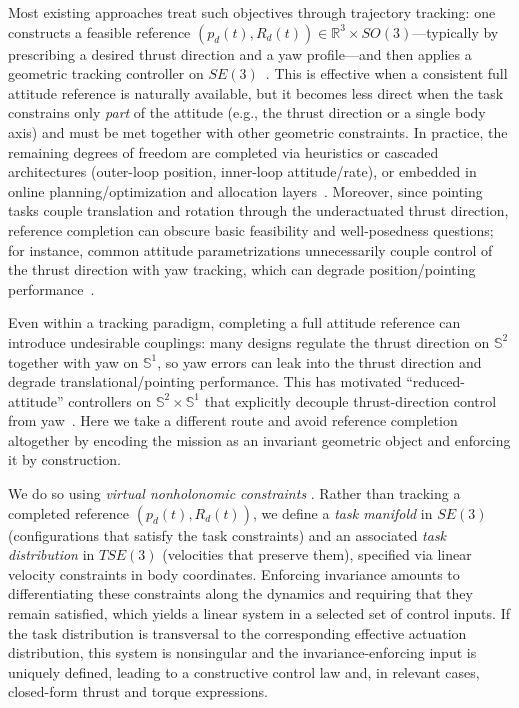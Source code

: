 \documentclass[letterpaper, 10 pt, conference]{ieeeconf}
\begin{document}
Most existing approaches treat such objectives through trajectory tracking: one constructs a feasible reference $(p_d(t),R_d(t))\in\mathbb{R}^{3}\times SO(3)$---typically by prescribing a desired thrust direction and a yaw profile---and then applies a geometric tracking controller on $SE(3)$~\cite{Lee2010CDC,MellingerKumar2011ICRA}. 
This is effective when a consistent full attitude reference is naturally available, but it becomes less direct when the task constrains only \emph{part} of the attitude (e.g., the thrust direction or a single body axis) and must be met together with other geometric constraints. 
In practice, the remaining degrees of freedom are completed via heuristics or cascaded architectures (outer-loop position, inner-loop attitude/rate), or embedded in online planning/optimization and allocation layers~\cite{Bangura2017Thesis,RichterBryRoy2013ISRR,BryRichterBachrachRoy2015IJRR}. 
Moreover, since pointing tasks couple translation and rotation through the underactuated thrust direction, reference completion can obscure basic feasibility and well-posedness questions; for instance, common attitude parametrizations unnecessarily couple control of the thrust direction with yaw tracking, which can degrade position/pointing performance~\cite{kooijman2019trajectory}.



Even within a tracking paradigm, completing a full attitude reference can introduce undesirable couplings: many designs regulate the thrust direction on $\mathbb{S}^2$ together with yaw on $\mathbb{S}^1$, so yaw errors can leak into the thrust direction and degrade translational/pointing performance. This has motivated ``reduced-attitude'' controllers on $\mathbb{S}^2\times \mathbb{S}^1$ that explicitly decouple thrust-direction control from yaw~\cite{kooijman2019trajectory}. Here we take a different route and avoid reference completion altogether by encoding the mission as an invariant geometric object and enforcing it by construction.

We do so using \emph{virtual nonholonomic constraints} \cite{Simoes:linear:nonholonomic, stratoglou2024geometry, stratoglou2024virtualc, simoes2025geometric}. Rather than tracking a completed reference $(p_d(t),R_d(t))$, we define a \emph{task manifold} in $SE(3)$ (configurations that satisfy the task constraints) and an associated \emph{task distribution} in $TSE(3)$ (velocities that preserve them), specified via linear velocity constraints in body coordinates. Enforcing invariance amounts to differentiating these constraints along the dynamics and requiring that they remain satisfied, which yields a linear system in a selected set of control inputs. If the task distribution is transversal to the corresponding effective actuation distribution, this system is nonsingular and the invariance-enforcing input is uniquely defined, leading to a constructive control law and, in relevant cases, closed-form thrust and torque expressions.
\end{document}
